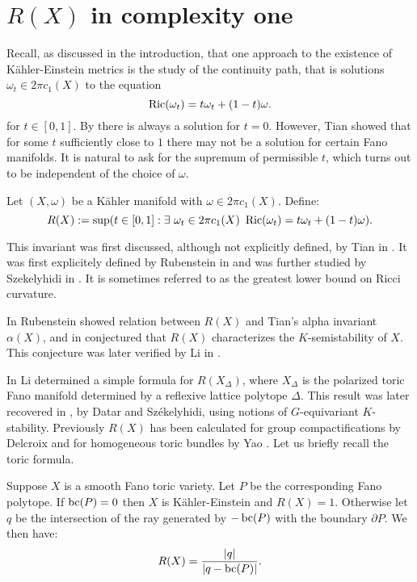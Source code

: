 \chapter{$R(X)$ in complexity one} \label{chap:R(X)}
Recall, as discussed in the introduction, that one approach to the existence of K\"ahler-Einstein metrics is the study of the continuity path, that is solutions \(\omega_t \in 2 \pi c_1(X) \) to the equation
\[
\mathop{\rm Ric}\nolimits(\omega_t) = t\omega_t + (1-t) \omega.
\]
for \(t \in [0,1]\). By \cite{Yau1977} there is always a solution for \(t = 0\). However, Tian \cite{tian1992stability} showed that for some \(t\) sufficiently close to \(1\) there may not be a solution for certain Fano manifolds. It is natural to ask for the supremum of permissible \(t\), which turns out to be independent of the choice of \(\omega\).
\begin{definition}
Let \((X,\omega)\) be a K\"ahler manifold with \(\omega \in 2 \pi c_1(X)\). Define:
\[
R(X) := \sup ( t \in [0,1]   : \exists \ \omega_t \in 2 \pi c_1(X)  \ \mathop{\rm Ric}\nolimits( \omega_t) = t \omega_t + (1-t) \omega ).
\]
\end{definition}
This invariant was first discussed, although not explicitly defined, by Tian in \cite{Tian87}. It was first explicitely defined by Rubenstein in \cite{rubinstein2008} and was further studied by Szekelyhidi in \cite{szekelyhidi2011}. It is sometimes referred to as the greatest lower bound on Ricci curvature.

In \cite{rubinstein2008} Rubenstein showed relation between \(R(X)\) and Tian's alpha invariant \(\alpha(X)\), and in \cite{rubinstein2009} conjectured that \(R(X)\) characterizes the \(K\)-semistability of \(X\). This conjecture was later verified by Li in \cite{li2017}.

In \cite{li2011} Li  determined a simple formula for \(R(X_\Delta)\), where \(X_\Delta\) is the polarized toric Fano manifold determined by a reflexive lattice polytope \(\Delta\). This result was later recovered in \cite{datar2016kahler}, by Datar and Sz\'ekelyhidi, using notions of \(G\)-equivariant \(K\)-stability. Previously \(R(X)\) has been calculated for group compactifications by Delcroix \cite{delcroix2017} and for homogeneous toric bundles by Yao \cite{yao2017}. Let us briefly recall the toric formula.
\begin{theorem}
Suppose \(X\) is a smooth Fano toric variety. Let \(P\) be the corresponding Fano polytope. If \(\mathop{\rm bc}\nolimits(P) = 0\) then \(X\) is K\"ahler-Einstein and \(R(X) = 1\). Otherwise let \(q\) be the intersection of the ray generated by \(-\mathop{\rm bc}\nolimits(P)\) with the boundary \(\partial P\). We then have:
\[
R(X) = \frac{|q|}{|q-\mathop{\rm bc}\nolimits(P)|}.
\]
\end{theorem}

